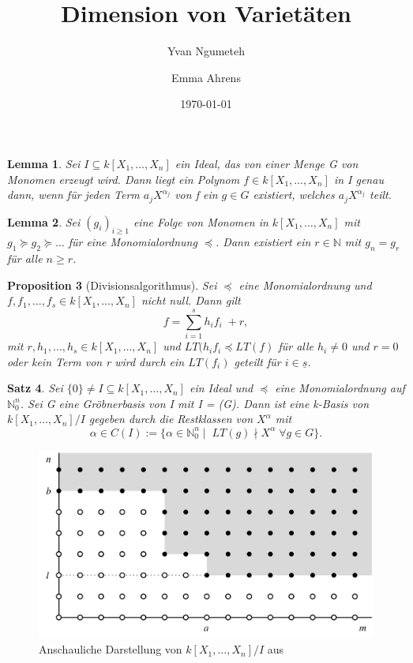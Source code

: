 \documentclass{article}
\title{Dimension von Varietäten}
\date{\today}
\author{Yvan Ngumeteh \and Emma Ahrens}
\newtheorem{satz}{Satz}
\newtheorem{lemma}[satz]{Lemma}
\newtheorem{proposition}[satz]{Proposition}
\newcommand*{\R}{k[X_{1},\ldots,X_{n}]}
\begin{document}
	\maketitle

	\begin{lemma} \label{1.2.3}
	Sei \(I \subseteq \R\) ein Ideal, das von einer Menge G von Monomen erzeugt wird. Dann liegt
	ein Polynom \(f \in \R\) in I genau dann, wenn für jeden Term \(a_{j}X^{\alpha_{j}}\) von f ein
	\(g \in G\) existiert, welches \(a_{j}X^{\alpha_{j}}\) teilt.
	\end{lemma}

	\begin{lemma} \label{1.2.4}
	Sei \((g_{i})_{i \geq 1}\) eine Folge von Monomen in \(\R\) mit \(g_{1} \succeq g_{2} \succeq
	\ldots\) für eine Monomialordnung \(\preceq\). Dann existiert ein \(r \in \mathbb{N}\) mit 
	\(g_{n} = g_{r}\) für alle \(n \geq r\). 
	\end{lemma}

	\begin{proposition}[Divisionsalgorithmus] \label{1.2.5}
	Sei \(\preceq\) eine Monomialordnung und \(f, f_{1}, \ldots, f_{s} \in \R\) nicht null. Dann
	gilt \begin{displaymath} f = \sum_{i=1}^{s} h_{i}f_{i}\; + r, \end{displaymath} mit
	\(r, h_{1}, \ldots, h_{s} \in \R\) und \(LT(h_{i}f_{i} \preceq LT(f)\) für alle \(h_{i} \neq 0
	\) und \(r = 0\) oder kein Term von r wird durch ein \(LT(f_{i})\) geteilt für \(i \in
	\underline{s}\).
	\end{proposition}

	\begin{satz} \label{1.2.8}
	Sei \(\{0\} \neq I \subseteq \R\) ein Ideal und \(\preceq\) eine Monomialordnung auf
	\(\mathbb{N}^{n}_{0}\). Sei G eine Gröbnerbasis von I mit I = (G). Dann ist eine k-Basis von 
	\(\R/I\) gegeben durch die Restklassen von \(X^{\alpha}\) mit
	\begin{displaymath}
	\alpha \in C(I) := \{\alpha \in \mathbb{N}^{n}_{0}\; |\;\; LT(g) \nmid X^{\alpha}\; \forall g 
	\in G\}.
	\end{displaymath}
	\end{satz}

	\begin{figure}[ht]
		\centering
		\includegraphics[width=.75\linewidth]{Dots.png}
		\caption{Anschauliche Darstellung von \(\R/I\) aus \cite{CLOS}}
		\label{dots}
	\end{figure}
\end{document}
